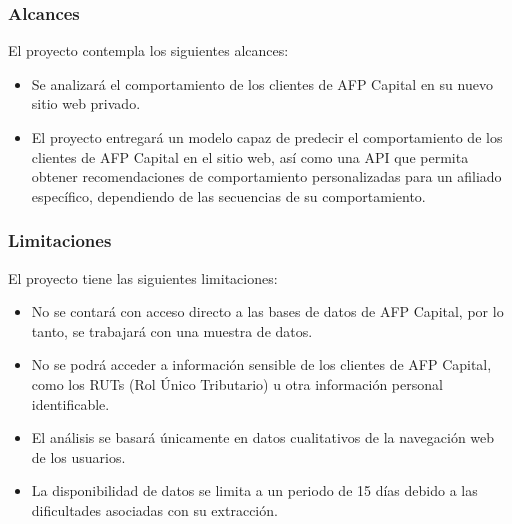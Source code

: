 \subsubsection{Alcances}

El proyecto contempla los siguientes alcances:

\begin{itemize}
\item Se analizará el comportamiento de los clientes de AFP Capital en su nuevo sitio web privado.
\item El proyecto entregará un modelo capaz de predecir el comportamiento de los clientes de AFP Capital en el sitio web, así como una API que permita obtener recomendaciones de comportamiento personalizadas para un afiliado específico, dependiendo de las secuencias de su comportamiento.
\end{itemize}

\subsubsection{Limitaciones}

El proyecto tiene las siguientes limitaciones:

\begin{itemize}
\item No se contará con acceso directo a las bases de datos de AFP Capital, por lo tanto, se trabajará con una muestra de datos.
\item No se podrá acceder a información sensible de los clientes de AFP Capital, como los RUTs (Rol Único Tributario) u otra información personal identificable.
\item El análisis se basará únicamente en datos cualitativos de la navegación web de los usuarios.
\item La disponibilidad de datos se limita a un periodo de 15 días debido a las dificultades asociadas con su extracción.
\end{itemize}
